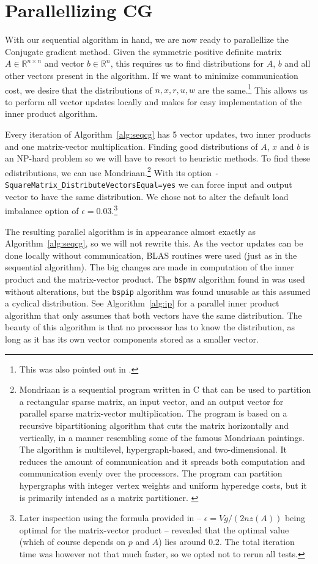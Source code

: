 \documentclass[11pt]{amsart}
\theoremstyle{definition}
\newcommand{\R}{\mathbb{R}}
\begin{document}
\section{Parallellizing CG}
With our sequential algorithm in hand, we are now ready to parallellize the Conjugate gradient method. Given the symmetric positive definite matrix $A \in \R^{n \times n}$ and vector $b \in \R^n$, this requires us to find distributions for $A$, $b$ and all other vectors present in the algorithm. If we want to minimize communication cost, we desire that the distributions of $n, x, r, u, w$ are the same.\footnote{This was also pointed out in \cite[p.~174]{biss04}.} This allows us to perform all vector updates locally and makes for easy implementation of the inner product algorithm.

Every iteration of Algorithm~\ref{alg:seqcg} has 5 vector updates, two inner products and one matrix-vector multiplication. Finding good distributions of $A$, $x$ and $b$ is an NP-hard problem so we will have to resort to heuristic methods. To find these edistributions, we can use Mondriaan.\footnote{Mondriaan is a sequential program written in C that can be used to partition a rectangular sparse matrix, an input vector, and an output vector for parallel sparse matrix-vector multiplication. The program is based on a recursive bipartitioning algorithm that cuts the matrix horizontally and vertically, in a manner resembling some of the famous Mondriaan paintings. The algorithm is multilevel, hypergraph-based, and two-dimensional. It reduces the amount of communication and it spreads both computation and communication evenly over the processors. The program can partition hypergraphs with integer vertex weights and uniform hyperedge costs, but it is primarily intended as a matrix partitioner. \cite{mondriaan}} With its option \texttt{-SquareMatrix\_DistributeVectorsEqual=yes} we can force input and output vector to have the same distribution. We chose not to alter the default load imbalance option of $\epsilon = 0.03$.\footnote{Later inspection using the formula provided in \cite[p.~189]{biss04} -- $\epsilon = Vg/(2nz(A))$ being optimal for the matrix-vector product -- revealed that the optimal value (which of course depends on $p$ and $A$) lies around $0.2$. The total iteration time was however not that much faster, so we opted not to rerun all tests.}

The resulting parallel algorithm is in appearance almost exactly as Algorithm~\ref{alg:seqcg}, so we will not rewrite this. As the vector updates can be done locally without communication, BLAS routines were used (just as in the sequential algorithm). The big changes are made in computation of the inner product and the matrix-vector product. The \texttt{bspmv} algorithm found in \cite[Alg.~4.5]{biss04} was used without alterations, but the \texttt{bspip} algorithm \cite[Alg.~1.1]{biss04} was found unusable as this assumed a cyclical distribution. See Algorithm~\ref{alg:ip} for a parallel inner product algorithm that only assumes that both vectors have the same distribution. The beauty of this algorithm is that no processor has to know the distribution, as long as it has its own vector components stored as a smaller vector.
\end{document}
